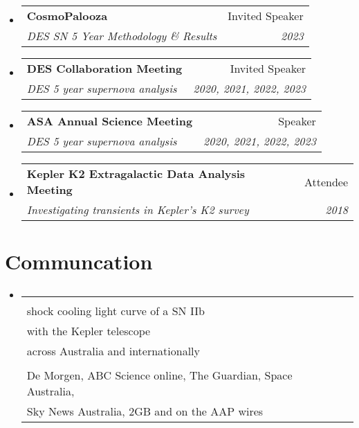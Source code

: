 \documentclass[letterpaper,11pt]{article}
\makeatletter
\newcommand{\resumeItem}[1]{
  \item\small{
    {#1 \vspace{-2pt}}
  }
}
\newcommand{\resumeSubheading}[4]{
  \vspace{-2pt}\item
    \begin{tabular*}{0.97\textwidth}[t]{l@{\extracolsep{\fill}}r}
      \textbf{#1} & #2 \\
      \textit{\small#3} & \textit{\small #4} \\
    \end{tabular*}\vspace{-7pt}
}
\newcommand{\resumeSubHeadingListStart}{\begin{itemize}[leftmargin=0.15in, label={}]}
\newcommand{\resumeSubHeadingListEnd}{\end{itemize}}
\newcommand{\resumeItemListStart}{\begin{itemize}}
\newcommand{\resumeItemListEnd}{\end{itemize}\vspace{-5pt}}
\newcommand{\conferenceElement}[5]{%
    \resumeSubHeadingListStart
        \resumeSubheading
            {#1}
            {#2}
            {#3}
            {#4}
            \ifthenelse{\isempty{#5}}{}{%
                \resumeItemListStart
                    \renewcommand*{\do}[1]{\resumeItem{##1}}
                    \docsvlist{#5}%
                \resumeItemListEnd
            }%
    \resumeSubHeadingListEnd
}
\newcommand{\communicationElement}[5]{%
    \resumeSubHeadingListStart
        \resumeSubheading
            {\makecell[l]{#1}}
            {\makecell[r]{#2}}
            {\makecell[l]{#3}}
            {\makecell[r]{#4}}
            \ifthenelse{\isempty{#5}}{}{%
                \resumeItemListStart
                    \renewcommand*{\do}[1]{\resumeItem{##1}}
                    \docsvlist{#5}%
                \resumeItemListEnd
            }%
    \resumeSubHeadingListEnd
}
\makeatother
\begin{document}
    \conferenceElement{CosmoPalooza}{Invited Speaker}{DES SN 5 Year Methodology \& Results}{2023}{}
    \conferenceElement{DES Collaboration Meeting}{Invited Speaker}{DES 5 year supernova analysis}{2020, 2021, 2022, 2023}{}
    \conferenceElement{ASA Annual Science Meeting}{Speaker}{DES 5 year supernova analysis}{2020, 2021, 2022, 2023}{}
    \conferenceElement{Kepler K2 Extragalactic Data Analysis Meeting}{Attendee}{Investigating transients in Kepler's K2 survey}{2018}{}

\section{Communcation}

    \communicationElement{SN2017jgh: a high-cadence complete\\shock cooling light curve of a SN IIb\\with the Kepler telescope}{Over 180 items in print, radio, and online,\\across Australia and internationally}{\textbf{Highlights:}, Al Jazeera, National Geographic Indonesia, Radio Canada,\\De Morgen, ABC Science online, The Guardian, Space Australia,\\Sky News Australia, 2GB and on the AAP wires}{2021}{}

\end{document}
